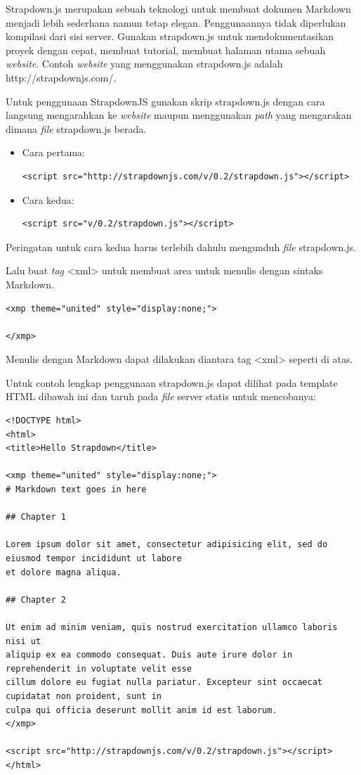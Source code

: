 Strapdown.js merupakan sebuah teknologi untuk membuat dokumen Markdown menjadi lebih sederhana namun tetap elegan. Penggunaannya tidak diperlukan kompilasi dari sisi server. Gunakan strapdown.js untuk mendokumentasikan proyek dengan cepat, membuat tutorial, membuat halaman utama sebuah {\it website}. Contoh {\it website} yang menggunakan strapdown.js adalah http://strapdownjs.com/.

Untuk penggunaan StrapdownJS gunakan skrip strapdown.js dengan cara langsung mengarahkan ke {\it website} maupun menggunakan {\it path} yang mengarakan dimana {\it file} strapdown.js berada.
\begin{itemize}
\item Cara pertama:\\
\begin{lstlisting}[basicstyle=\footnotesize]
<script src="http://strapdownjs.com/v/0.2/strapdown.js"></script>
\end{lstlisting}
\item Cara kedua:\\
\begin{lstlisting}[basicstyle=\footnotesize]
<script src="v/0.2/strapdown.js"></script>
\end{lstlisting}
\end{itemize}

Peringatan untuk cara kedua harus terlebih dahulu mengunduh {\it file} strapdown.js.

Lalu buat {\it tag} <xml> untuk membuat area untuk menulis dengan sintaks Markdown.
\begin{lstlisting}[basicstyle=\footnotesize]
<xmp theme="united" style="display:none;">

</xmp>
\end{lstlisting}
Menulis dengan Markdown dapat dilakukan diantara  tag <xml> seperti di atas.

Untuk contoh lengkap penggunaan strapdown.js dapat dilihat pada template HTML
dibawah ini dan taruh pada {\it file} server statis untuk mencobanya:
\begin{lstlisting}[basicstyle=\footnotesize]
<!DOCTYPE html>
<html>
<title>Hello Strapdown</title>

<xmp theme="united" style="display:none;">
# Markdown text goes in here

## Chapter 1

Lorem ipsum dolor sit amet, consectetur adipisicing elit, sed do eiusmod tempor incididunt ut labore
et dolore magna aliqua. 

## Chapter 2

Ut enim ad minim veniam, quis nostrud exercitation ullamco laboris nisi ut
aliquip ex ea commodo consequat. Duis aute irure dolor in reprehenderit in voluptate velit esse
cillum dolore eu fugiat nulla pariatur. Excepteur sint occaecat cupidatat non proident, sunt in
culpa qui officia deserunt mollit anim id est laborum.
</xmp>

<script src="http://strapdownjs.com/v/0.2/strapdown.js"></script>
</html>
\end{lstlisting}

